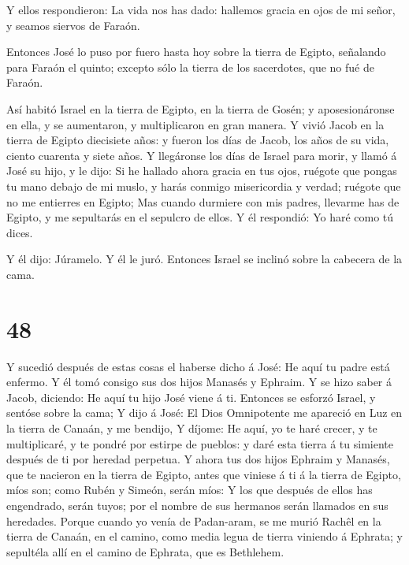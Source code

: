  Y ellos respondieron: La vida nos has dado: hallemos
gracia en ojos de mi señor, y seamos siervos de Faraón.

 Entonces José lo puso por fuero hasta hoy sobre la tierra
de Egipto, señalando para Faraón el quinto; excepto sólo la tierra de
los sacerdotes, que no fué de Faraón.

 Así habitó Israel en la tierra de Egipto, en la tierra de
Gosén; y aposesionáronse en ella, y se aumentaron, y multiplicaron en
gran manera.  Y vivió Jacob en la tierra de Egipto
diecisiete años: y fueron los días de Jacob, los años de su vida, ciento
cuarenta y siete años.  Y llegáronse los días de Israel
para morir, y llamó á José su hijo, y le dijo: Si he hallado ahora
gracia en tus ojos, ruégote que pongas tu mano debajo de mi muslo, y
harás conmigo misericordia y verdad; ruégote que no me entierres en
Egipto;  Mas cuando durmiere con mis padres, llevarme has
de Egipto, y me sepultarás en el sepulcro de ellos. Y él respondió: Yo
haré como tú dices.

 Y él dijo: Júramelo. Y él le juró. Entonces Israel se
inclinó sobre la cabecera de la cama.

\hypertarget{section-47}{%
\section{48}\label{section-47}}

 Y sucedió después de estas cosas el haberse dicho á José:
He aquí tu padre está enfermo. Y él tomó consigo sus dos hijos Manasés y
Ephraim.  Y se hizo saber á Jacob, diciendo: He aquí tu hijo
José viene á ti. Entonces se esforzó Israel, y sentóse sobre la cama;
 Y dijo á José: El Dios Omnipotente me apareció en Luz en la
tierra de Canaán, y me bendijo,  Y díjome: He aquí, yo te
haré crecer, y te multiplicaré, y te pondré por estirpe de pueblos: y
daré esta tierra á tu simiente después de ti por heredad perpetua.
 Y ahora tus dos hijos Ephraim y Manasés, que te nacieron en
la tierra de Egipto, antes que viniese á ti á la tierra de Egipto, míos
son; como Rubén y Simeón, serán míos:  Y los que después de
ellos has engendrado, serán tuyos; por el nombre de sus hermanos serán
llamados en sus heredades.  Porque cuando yo venía de
Padan-aram, se me murió Rachêl en la tierra de Canaán, en el camino,
como media legua de tierra viniendo á Ephrata; y sepultéla allí en el
camino de Ephrata, que es Bethlehem.

